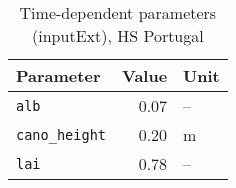 \begin{table}[ht]
\centering
\caption{Time-dependent parameters (\textsf{inputExt}), HS Portugal} 
\label{tab:portugalHS_inputExt}
\begin{tabular}{lrl}
  \hline
Parameter & Value & Unit \\ 
  \hline
\verb!alb! & 0.07 & -- \\ 
  \verb!cano_height! & 0.20 & m \\ 
  \verb!lai! & 0.78 & -- \\ 
   \hline
\end{tabular}
\end{table}
